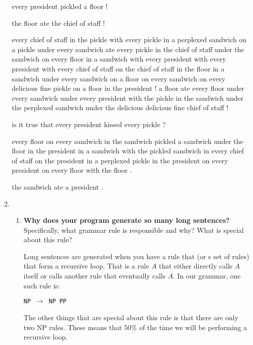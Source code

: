 \documentclass[10pt]{article}
\begin{document}
\begin{enumerate}
{every president pickled a floor !

\vspace{0.2cm}

the floor ate the chief of staff !

\vspace{0.2cm}

every chief of staff in the pickle with every pickle in a perplexed sandwich on a pickle under every sandwich ate every pickle in the chief of staff under the sandwich on every floor in a sandwich with every president with every president with every chief of staff on the chief of staff in the floor in a sandwich under every sandwich on a floor on every sandwich on every delicious fine pickle on a floor in the president !
a floor ate every floor under every sandwich under every president with the pickle in the sandwich under the perplexed sandwich under the delicious delicious fine chief of staff !

\vspace{0.2cm}

is it true that every president kissed every pickle ?

\vspace{0.2cm}

every floor on every sandwich in the sandwich pickled a sandwich under the floor in the president in a sandwich with the pickled sandwich in every chief of staff on the president in a perplexed pickle in the president on every president on every floor with the floor .

\vspace{0.2cm}

the sandwich ate a president .

}

\item\begin{enumerate}
\item {\bf Why does your program generate so many long sentences?}
    Specifically, what grammar rule is responsible and why? What is
    special about this rule?

\vspace{0.2cm}

Long sentences are generated when you have a rule that (or s set of rules) that form a recursive loop. That is a rule $A$ that either directly calls $A$ itself or calls another rule that eventually calls $A$. In our grammar, one such rule is:

{\tt NP $\rightarrow$ NP  PP}

The other things that are special about this rule is that there are only two NP rules. These means that 50\% of the time we will be performing a recursive loop.


\end{enumerate}
\end{enumerate}
\end{document}
